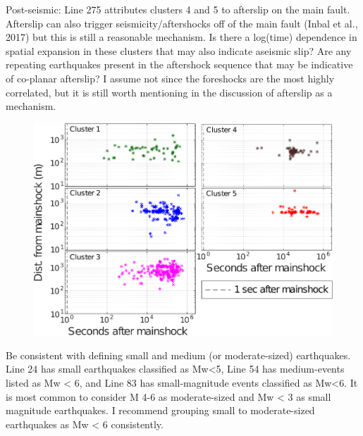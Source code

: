 \documentclass[10pt]{extarticle}
\begin{document}
\begin{Answer}
 \WorkInProgressRevTask
\end{Answer}
%
%



\begin{ReviewerComment}{1}
\noindent 
Post-seismic: Line 275 attributes clusters 4 and 5 to afterslip on the main fault. Afterslip can also trigger seismicity/aftershocks off of the main fault (Inbal et al., 2017) but this is still a reasonable mechanism. Is there a log(time) dependence in spatial expansion in these clusters that may also indicate aseismic slip? Are any repeating earthquakes present in the aftershock sequence that may be indicative of co-planar afterslip? I assume not since the foreshocks are the most highly correlated, but it is still worth mentioning in the discussion of afterslip as a mechanism.
\end{ReviewerComment}


\begin{Answer}
\begin{figure}[!h]
\begin{center}
 \includegraphics[width=0.8\linewidth]{S3_loglog_time.png} 
\end{center}
\end{figure}
 \WorkInProgressRevTask
\end{Answer}
%
%




\begin{ReviewerComment}{1}
\noindent 
Be consistent with defining small and medium (or moderate-sized) earthquakes. Line 24 has small earthquakes classified as  Mw<5, Line 54 has medium-events listed as Mw < 6, and Line 83 has small-magnitude events classified as Mw<6. It is most common to consider M 4-6 as moderate-sized and Mw < 3 as small magnitude earthquakes. I recommend grouping small to moderate-sized earthquakes as Mw < 6 consistently.

\end{ReviewerComment}
\end{document}
